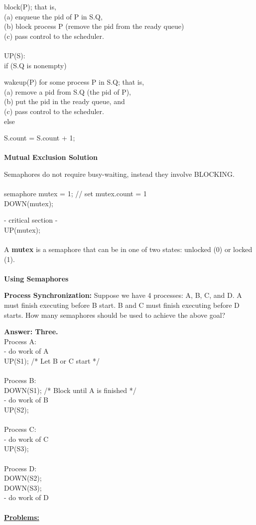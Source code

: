\documentclass[]{report}
\begin{document}
block(P); that is,\\
(a) enqueue the pid of P in S.Q,\\
(b) block process P (remove the pid from the ready queue)\\
(c) pass control to the scheduler.\\\\
UP(S):\\
if (S.Q is nonempty)

wakeup(P) for some process P in S.Q; that is,\\
(a) remove a pid from S.Q (the pid of P),\\
(b) put the pid in the ready queue, and\\
(c) pass control to the scheduler.\\
else

S.count = S.count + 1;\\\\
\textbf{Mutual Exclusion Solution}

Semaphores do not require busy-waiting, instead
they involve BLOCKING.\\\\
semaphore mutex = 1; // set mutex.count = 1\\
DOWN(mutex);

- critical section -\\
UP(mutex);\\\\
A \textbf{mutex} is a semaphore that can be in one of two
states: unlocked (0) or locked (1).\\\\
\textbf{Using Semaphores}

\textbf{Process Synchronization: }Suppose we have 4 processes: A, B, C, and D. A must
finish executing before B start. B and C must finish
executing before D starts. How many semaphores should be used to achieve the above goal?

\textbf{Answer: Three.}
\\
Process A:\\
- do work of A\\
UP(S1);
/* Let B or C start */\\\\
Process B:\\
DOWN(S1); /* Block until A is finished */\\
- do work of B\\
UP(S2);\\\\
Process C:\\
- do work of C\\
UP(S3);\\\\
Process D:\\
DOWN(S2);\\
DOWN(S3);\\
- do work of D\\\\
\underline{\textbf{Problems:}}
\end{document}

